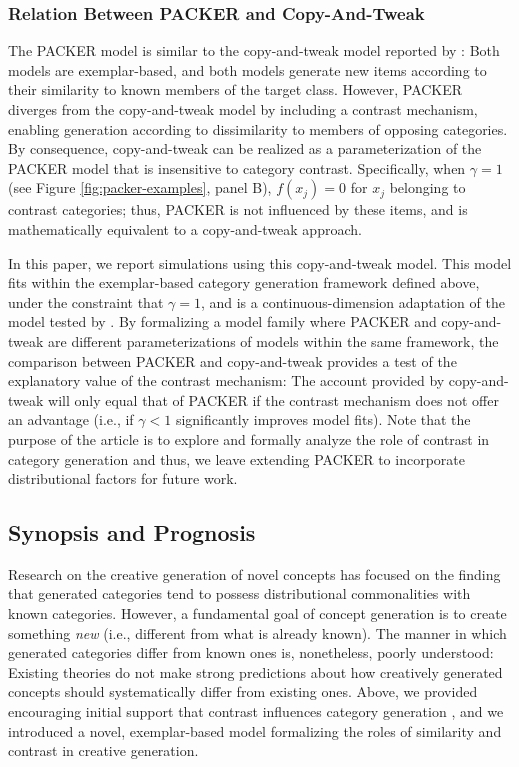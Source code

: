 \documentclass[12pt]{article}
\begin{document}
\begin{flushleft}
\subsubsection{Relation Between PACKER and Copy-And-Tweak}
\label{section:copytweak-packer}
The PACKER model is similar to the copy-and-tweak model reported by \cite{jern2013probabilistic}: Both models are exemplar-based, and both models generate new items according to their similarity to known members of the target class. However, PACKER diverges from the copy-and-tweak model by including a contrast mechanism, enabling generation according to dissimilarity to members of opposing categories. By consequence, copy-and-tweak can be realized as a parameterization of the PACKER model that is insensitive to category contrast. Specifically, when $\gamma = 1$ (see Figure \ref{fig:packer-examples}, panel B), $f(x_j) = 0$ for $x_j$ belonging to contrast categories; thus, PACKER is not influenced by these items, and is mathematically equivalent to a copy-and-tweak approach. 

In this paper, we report simulations using this copy-and-tweak model. This model fits within the exemplar-based category generation framework defined above, under the constraint that $\gamma = 1$, and is a continuous-dimension adaptation of the model tested by \cite{jern2013probabilistic}. By formalizing a model family where PACKER and copy-and-tweak are different parameterizations of models within the same framework, the comparison between PACKER and copy-and-tweak provides a test of the explanatory value of the contrast mechanism: The account provided by copy-and-tweak will only equal that of PACKER if the contrast mechanism does not offer an advantage (i.e., if $\gamma < 1$ significantly improves model fits). Note that the purpose of the article is to explore and formally analyze the role of contrast in category generation and thus, we leave extending PACKER to incorporate distributional factors \citep[as explored by][]{jern2013probabilistic} for future work.


\subsection{Synopsis and Prognosis}

Research on the creative generation of novel concepts has focused on the finding that generated categories tend to possess distributional commonalities with known categories. However, a fundamental goal of concept generation is to create something {\em new} (i.e., different from what is already known). The manner in which generated categories differ from known ones is, nonetheless, poorly understood: Existing theories do not make strong predictions about how creatively generated concepts should systematically differ from existing ones. Above, we provided encouraging initial support that contrast influences category generation \citep[][Experiment 3]{jern2013probabilistic}, and we introduced a novel, exemplar-based model formalizing the roles of similarity and contrast in creative generation.


\end{flushleft}
\end{document}
